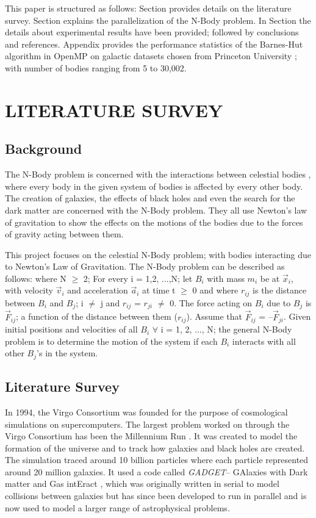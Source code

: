 This paper is structured as follows: Section  provides details on the literature survey. Section  explains the parallelization of the N-Body problem. In Section  the details about experimental results have been provided; followed by conclusions and references. Appendix provides the performance statistics of the Barnes-Hut algorithm in OpenMP on galactic datasets chosen from Princeton University \cite{c4}; with number of bodies ranging from 5 to 30,002.

\section{LITERATURE SURVEY}

\subsection{Background}

The N-Body problem is concerned with the interactions between celestial bodies \cite{c5}, where every body in the given system of bodies is affected by every other body. The creation of galaxies, the effects of black holes and even the search for the dark matter are concerned with the N-Body problem. They all use Newton’s law of gravitation to show the effects on the motions of the bodies due to the forces of gravity acting between them.\par

This project focuses on the celestial N-Body problem; with bodies interacting due to Newton’s Law of Gravitation. The N-Body problem can be described as follows: where N $\geq$ 2; For every i = 1,2, ...,N; let $B_i$ with mass $m_i$ be at $\vec{x}_i$, with velocity $\vec{v}_i$ and acceleration $\vec{a}_i$ at time t $\geq$ 0 and where $r_{ij}$ is the distance between $B_i$ and $B_j$; i $\neq$ j and $r_{ij}$ = $r_{ji}$ $\neq$ 0. The force acting on $B_i$ due to $B_j$ is $\vec{F}_{ij}$; a function of the distance between them ($r_{ij}$). Assume that $\vec{F}_{ij}$ = {--}$\vec{F}_{ji}$. Given initial positions and velocities of all $B_i$ $\forall$ i = 1, 2, ..., N; the general N-Body problem is to determine the motion of the system if each $B_i$ interacts with all other $B_j$’s in the system.


\subsection{Literature Survey}

In 1994, the Virgo Consortium was founded for the purpose of cosmological simulations on supercomputers. The largest problem worked on through the Virgo Consortium has been the Millennium Run \cite{c6}. It was created to model the formation of the universe and to track how galaxies and black holes are created. The simulation traced around 10 billion particles where each particle represented around 20 million galaxies. It used a code called \textit{GADGET}{--} GAlaxies with Dark matter and Gas intEract \cite{c7}, which was originally written in serial to model collisions between galaxies but has since been developed to run in parallel and is now used to model a larger range of astrophysical problems. \par


